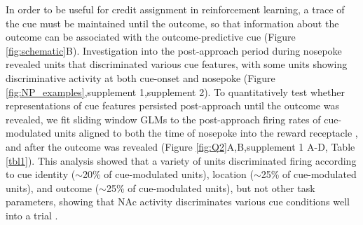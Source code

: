 \documentclass[11pt]{article}
\providecommand{\DIFadd}[1]{{\protect\color{red} \sf #1}} %
\providecommand{\DIFdel}[1]{} %
\providecommand{\DIFaddbegin}{} %
\providecommand{\DIFaddend}{} %
\providecommand{\DIFdelbegin}{} %
\providecommand{\DIFdelend}{} %
\newcommand{\DIFscaledelfig}{0.5}
\newlength{\DIFdelgraphicswidth} %
\newlength{\DIFdelgraphicsheight} %
\newcommand{\DIFaddincludegraphics}[2][]{{\color{red}\fbox{\DIFOincludegraphics[#1]{#2}}}} %
\newcommand{\DIFdelincludegraphics}[2][]{%
\sbox{\DIFdelgraphicsbox}{\DIFOincludegraphics[#1]{#2}}%
\settoboxwidth{\DIFdelgraphicswidth}{\DIFdelgraphicsbox} %
\settoboxtotalheight{\DIFdelgraphicsheight}{\DIFdelgraphicsbox} %
\scalebox{\DIFscaledelfig}{%
\parbox[b]{\DIFdelgraphicswidth}{\usebox{\DIFdelgraphicsbox}\\[-\baselineskip] \rule{\DIFdelgraphicswidth}{0em}}\llap{\resizebox{\DIFdelgraphicswidth}{\DIFdelgraphicsheight}{%
\setlength{\unitlength}{\DIFdelgraphicswidth}%
\begin{picture}(1,1)%
\thicklines\linethickness{2pt} %
{\color[rgb]{1,0,0}\put(0,0){\framebox(1,1){}}}%
{\color[rgb]{1,0,0}\put(0,0){\line( 1,1){1}}}%
{\color[rgb]{1,0,0}\put(0,1){\line(1,-1){1}}}%
\end{picture}%
}\hspace*{3pt}}} %
} %
\DeclareRobustCommand{\DIFaddbegin}{\DIFOaddbegin \let\includegraphics\DIFaddincludegraphics} %
\DeclareRobustCommand{\DIFaddend}{\DIFOaddend \let\includegraphics\DIFOincludegraphics} %
\DeclareRobustCommand{\DIFdelbegin}{\DIFOdelbegin \let\includegraphics\DIFdelincludegraphics} %
\DeclareRobustCommand{\DIFdelend}{\DIFOaddend \let\includegraphics\DIFOincludegraphics} %
\begin{document}
In order to be useful for credit assignment in reinforcement learning, a trace of the cue must be maintained until the outcome, so that information about the outcome can be associated with the outcome-predictive cue \DIFdelbegin \DIFdel{. To }\DIFdelend \DIFaddbegin \DIFadd{(Figure \ref{fig:schematic}B). Investigation into the post-approach period during nosepoke revealed units that discriminated various cue features, with some units showing discriminative activity at both cue-onset and nosepoke (Figure \ref{fig:NP_examples},supplement 1,supplement 2). To quantitatively }\DIFaddend test whether representations of cue features persisted post-approach until the outcome was revealed, we fit \DIFdelbegin \DIFdel{a GLM }\DIFdelend \DIFaddbegin \DIFadd{sliding window GLMs }\DIFaddend to the post-approach firing rates of cue-modulated units aligned to \DIFaddbegin \DIFadd{both }\DIFaddend the time of nosepoke into the reward receptacle\DIFaddbegin \DIFadd{, and after the outcome was revealed (Figure \ref{fig:Q2}A,B,supplement 1 A-D, Table \ref{tbl1})}\DIFaddend . This analysis showed that a variety of units \DIFdelbegin \DIFdel{still }\DIFdelend discriminated firing according to \DIFdelbegin \DIFdel{various
cue features, }\DIFdelend \DIFaddbegin \DIFadd{cue identity ($\sim$20\% of cue-modulated units), location ($\sim$25\% of cue-modulated units), and outcome ($\sim$25\% of cue-modulated units), }\DIFaddend but not other task parameters, showing that NAc activity discriminates various cue conditions well into a trial\DIFdelbegin \DIFdel{(Table \ref{tbl1},
Figures \ref{fig:NP_examples},\ref{fig:NP_GLM}).
Additionally, these units were
a mix between most of the units that encoded }\DIFdelend \DIFaddbegin \DIFadd{.
}
\end{document}
